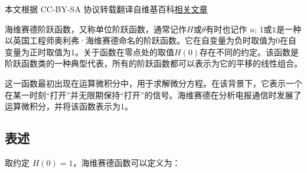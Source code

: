 
本文根据 CC-BY-SA 协议转载翻译自维基百科\href{https://en.wikipedia.org/wiki/Heaviside_step_function}{相关文章}

海维赛德阶跃函数，又称单位阶跃函数，通常记作$H$或$\theta$有时也记作 $u$; 1或$\mathbb{1}$是一种以英国工程师奥利弗·海维赛德命名的阶跃函数。它在自变量为负时取值为0在自变量为正时取值为1。关于函数在零点处的取值$H(0)$存在不同的约定。该函数是阶跃函数类的一种典型代表，所有的阶跃函数都可以表示为它的平移的线性组合。

这一函数最初出现在运算微积分中，用于求解微分方程。在该背景下，它表示一个在某一时刻“打开”并无限期保持“打开”的信号。海维赛德在分析电报通信时发展了运算微积分，并将该函数表示为1。  
\subsection{表述}
取约定 $H(0) = 1$，海维赛德函数可以定义为：

